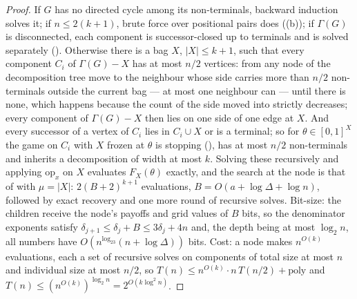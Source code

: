 \documentclass[11pt]{article}
\theoremstyle{plain}
\theoremstyle{definition}
\begin{document}
\begin{proof}
If $G$ has no directed cycle among its non-terminals, backward induction
solves it; if $n\le2(k+1)$, brute force over positional pairs does
((b)); if $\Gamma(G)$ is disconnected, each
component is successor-closed up to terminals and is solved separately
(). Otherwise there is a bag $X$, $|X|\le k+1$,
such that every component $C_i$ of $\Gamma(G)-X$ has at most $n/2$
vertices: from any node of the decomposition tree move to the neighbour
whose side carries more than $n/2$ non-terminals outside the current bag
--- at most one neighbour can --- until there is none, which happens
because the count of the side moved into strictly decreases; every
component of $\Gamma(G)-X$ then lies on one side of one edge at $X$. And
every
successor of a vertex of $C_i$ lies in $C_i\cup X$ or is a terminal; so
for $\theta\in[0,1]^{X}$ the game on $C_i$ with $X$ frozen at $\theta$ is
stopping (), has at most $n/2$ non-terminals and
inherits a decomposition of width at most $k$. Solving these recursively
and applying $\mathrm{op}_x$ on $X$ evaluates $F_X(\theta)$ exactly, and
the search at the node is that of  with $\mu=|X|$:
$2(B+2)^{k+1}$ evaluations, $B=O(a+\log\Delta+\log n)$, followed by exact
recovery and one more round of recursive solves. Bit-size: the children
receive the node's payoffs and grid values of $B$ bits, so the
denominator exponents satisfy $\delta_{j+1}\le\delta_j+B\le3\delta_j+4n$
and, the depth being at most $\log_2n$, all numbers have
$O(n^{\log_23}(n+\log\Delta))$ bits. Cost: a node makes $n^{O(k)}$
evaluations, each a set of recursive solves on components of total size at
most $n$ and individual size at most $n/2$, so
$T(n)\le n^{O(k)}\cdot n\,T(n/2)+\mathrm{poly}$ and
$T(n)\le(n^{O(k)})^{\log_2n}=2^{O(k\log^{2}n)}$.
\end{proof}
\end{document}
